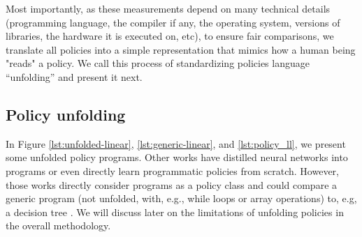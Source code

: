 Most importantly, as these measurements depend on many technical details (programming language, the compiler if any, the operating system, versions of libraries, the hardware it is executed on, etc), to ensure fair comparisons, we translate all policies into a simple representation that mimics how a human being "reads" a policy.
We call this process of standardizing policies language ``unfolding'' and present it next.

\subsection{Policy unfolding}

In Figure \ref{lst:unfolded-linear}, \ref{lst:generic-linear}, and \ref{lst:policy_ll}, we present some unfolded policy programs. Other works have distilled neural networks into programs \cite{PIRL} or even directly learn programmatic policies \cite{pirl2} from scratch. However, those works directly consider programs as a policy class and could compare a generic program (not unfolded, with, e.g., while loops or array operations) to, e.g, a decision tree \cite{leap}. We will discuss later on the limitations of unfolding policies in the overall methodology.

